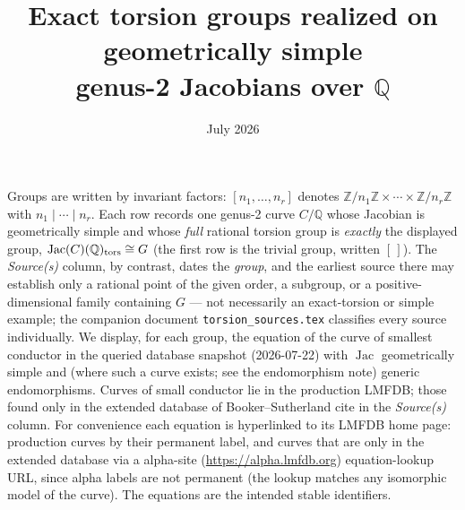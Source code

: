\documentclass[11pt]{amsart}
\title{Exact torsion groups realized on geometrically simple\\
genus-2 Jacobians over $\mathbb{Q}$}
\date{July 2026}
\begin{document}
\maketitle
\noindent Groups are written by invariant factors: $[n_1,\ldots,n_r]$ denotes
$\mathbb{Z}/n_1\mathbb{Z}\times\cdots\times\mathbb{Z}/n_r\mathbb{Z}$ with
$n_1\mid\cdots\mid n_r$.  Each row records one genus-2 curve $C/\mathbb{Q}$ whose
Jacobian is geometrically simple and whose \emph{full} rational torsion group is
\emph{exactly} the displayed group, $\operatorname{Jac}(C)(\mathbb{Q})_{\rm
tors}\cong G$ (the first row is the trivial group, written $[\,]$).  The \emph{Source(s)} column, by
contrast, dates the \emph{group}, and the earliest source there may establish
only a rational point of the given order, a subgroup, or a positive-dimensional
family containing $G$ --- not necessarily an exact-torsion or simple example; the
companion document \texttt{torsion\_sources.tex} classifies every source
individually.  We display, for each group, the equation of the curve of smallest
conductor in the queried database snapshot (2026-07-22) with $\operatorname{Jac}$
geometrically simple and (where such a curve exists; see the endomorphism note)
generic endomorphisms.  Curves of small conductor lie in the production LMFDB;
those found only in the extended database of Booker--Sutherland cite
\cite{BookerSutherland} in the \emph{Source(s)} column.  For convenience each
equation is hyperlinked to its LMFDB home page: production curves by their
permanent label, and curves that are only in the extended database via a
alpha-site (\url{https://alpha.lmfdb.org}) equation-lookup URL, since alpha
labels are not permanent (the lookup matches any isomorphic model of the
curve).  The equations are the intended stable identifiers.
\end{document}
